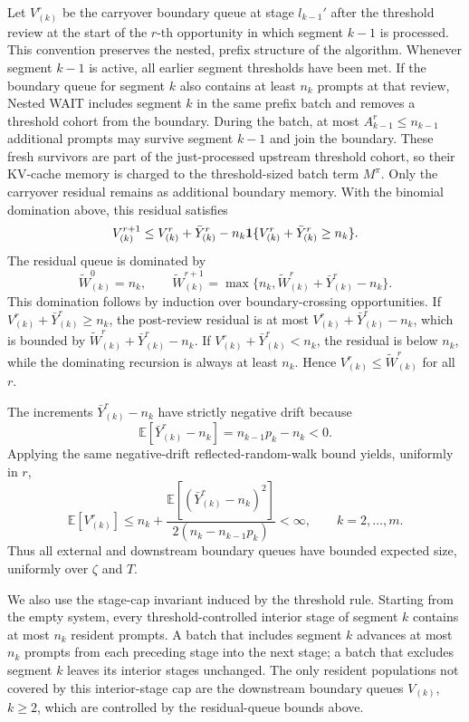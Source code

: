 Let \(V^r_{(k)}\) be the carryover boundary queue at stage \(l_{k-1}'\) after the threshold review at the start of the \(r\)-th opportunity in which segment \(k-1\) is processed. This convention preserves the nested, prefix structure of the algorithm. Whenever segment \(k-1\) is active, all earlier segment thresholds have been met. If the boundary queue for segment \(k\) also contains at least \(n_k\) prompts at that review, Nested WAIT includes segment \(k\) in the same prefix batch and removes a threshold cohort from the boundary. During the batch, at most \(A^r_{k-1}\le n_{k-1}\) additional prompts may survive segment \(k-1\) and join the boundary. These fresh survivors are part of the just-processed upstream threshold cohort, so their KV-cache memory is charged to the threshold-sized batch term \(M^\pi\). Only the carryover residual remains as additional boundary memory. With the binomial domination above, this residual satisfies
\[
    V^{r+1}_{(k)}
    \le
    V^r_{(k)}+\bar Y^r_{(k)}
    -
    n_k{\bf 1}\{V^r_{(k)}+\bar Y^r_{(k)}\ge n_k\}.
\]
The residual queue is dominated by
\[
    \widetilde W^0_{(k)}=n_k,\qquad
    \widetilde W^{r+1}_{(k)}
    =
    \max\{n_k,\widetilde W^r_{(k)}+\bar Y^r_{(k)}-n_k\}.
\]
This domination follows by induction over boundary-crossing opportunities. If \(V^r_{(k)}+\bar Y^r_{(k)}\ge n_k\), the post-review residual is at most \(V^r_{(k)}+\bar Y^r_{(k)}-n_k\), which is bounded by \(\widetilde W^r_{(k)}+\bar Y^r_{(k)}-n_k\). If \(V^r_{(k)}+\bar Y^r_{(k)}<n_k\), the residual is below \(n_k\), while the dominating recursion is always at least \(n_k\). Hence \(V^r_{(k)}\le\widetilde W^r_{(k)}\) for all \(r\).

The increments \(\bar Y^r_{(k)}-n_k\) have strictly negative drift because
\[
    \mathbb{E}[\bar Y^r_{(k)}-n_k]=n_{k-1}p_k-n_k<0.
\]
Applying the same negative-drift reflected-random-walk bound yields, uniformly in \(r\),
\[
    \mathbb{E}[V^r_{(k)}]
    \le
    n_k+
    \frac{\mathbb{E}[(\bar Y^r_{(k)}-n_k)^2]}{2(n_k-n_{k-1}p_k)}
    <\infty,\qquad k=2,\ldots,m.
\]
Thus all external and downstream boundary queues have bounded expected size, uniformly over \(\zeta\) and \(T\).

We also use the stage-cap invariant induced by the threshold rule. Starting from the empty system, every threshold-controlled interior stage of segment \(k\) contains at most \(n_k\) resident prompts. A batch that includes segment \(k\) advances at most \(n_k\) prompts from each preceding stage into the next stage; a batch that excludes segment \(k\) leaves its interior stages unchanged. The only resident populations not covered by this interior-stage cap are the downstream boundary queues \(V_{(k)}\), \(k\ge2\), which are controlled by the residual-queue bounds above.

